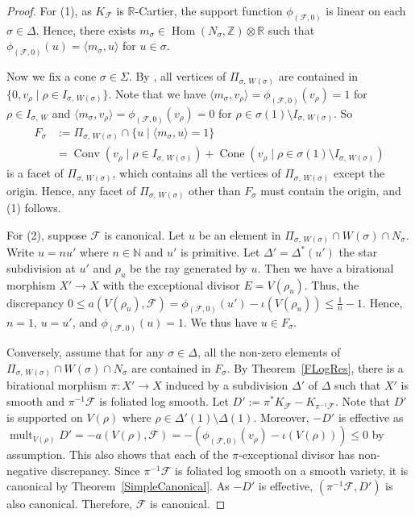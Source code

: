 \documentclass[12pt,reqno]{amsart}
\theoremstyle{definition}
\newcommand{\on}{\operatorname}
\newcommand\cF{{\mathcal{F}}}
\newcommand\bN{{\mathbb N}}
\newcommand\bR{{\mathbb R}}
\newcommand\bZ{{\mathbb Z}}
\begin{document}
\begin{proof}
    For (1), as $K_{\cF}$ is $\bR$-Cartier, the support function $\phi_{(\cF,0)}$ is linear on each $\sigma\in\Delta$. 
    Hence, there exists $m_\sigma\in \on{Hom}(N_\sigma,\bZ)\otimes\bR$ such that $\phi_{(\cF,0)}(u) = \langle m_\sigma, u\rangle$ for $u\in\sigma$. 

    Now we fix a cone $\sigma\in\Sigma$. 
    By \cite[Lemma 7.1.1]{CLS11}, all vertices of $\Pi_{\sigma,\,W(\sigma)}$ are contained in $\{0,v_\rho\mid\rho\in I_{\sigma,\,W(\sigma)}\}$. 
    Note that we have $\langle m_\sigma, v_\rho\rangle = \phi_{(\cF,0)}(v_\rho) = 1$ for $\rho\in I_{\sigma,\,W}$ and $\langle m_\sigma, v_\rho\rangle = \phi_{(\cF,0)}(v_\rho) = 0$ for $\rho\in\sigma(1)\setminus I_{\sigma,\,W(\sigma)}$. 
    So 
    \begin{align*}
        F_\sigma &:= \Pi_{\sigma,\,W(\sigma)}\cap\{u\mid\langle m_\sigma, u\rangle=1\} \\
         &= \on{Conv}(v_\rho\mid\rho\in I_{\sigma,\,W(\sigma)}) + \on{Cone}(v_\rho\mid\rho\in\sigma(1)\setminus I_{\sigma,\,W(\sigma)})
    \end{align*}
    is a facet of $\Pi_{\sigma,\,W(\sigma)}$, which contains all the vertices of $\Pi_{\sigma,\,W(\sigma)}$ except the origin. 
    Hence, any facet of $\Pi_{\sigma,\,W(\sigma)}$ other than $F_\sigma$ must contain the origin, and (1) follows. 

    For (2), suppose $\cF$ is canonical. 
    Let $u$ be an element in $\Pi_{\sigma,\,W(\sigma)}\cap W(\sigma)\cap N_\sigma$. Write $u=nu'$ where $n\in \bN$ and $u'$ is primitive. 
    Let $\Delta'=\Delta^*(u')$ the star subdivision at $u'$ and $\rho_u$ be the ray generated by $u$. 
    Then we have a birational morphism $X'\to X$ with the exceptional divisor $E=V(\rho_u)$. 
    Thus, the discrepancy $0\leq a(V(\rho_u),\cF) = \phi_{(\cF,0)}(u')-\iota(V(\rho_u))\leq \frac{1}{n}-1$. 
    Hence, $n=1$, $u=u'$, and $\phi_{(\cF,0)}(u)=1$. 
    We thus have $u\in F_\sigma$. 
        
    Conversely, assume that for any $\sigma\in\Delta$, all the non-zero elements of $\Pi_{\sigma,\,W(\sigma)}\cap W(\sigma)\cap N_\sigma$ are contained in $F_\sigma$. 
    By Theorem~\ref{FLogRes}, there is a birational morphism $\pi\colon X'\to X$ induced by a subdivision $\Delta'$ of $\Delta$ such that $X'$ is smooth and $\pi^{-1}\cF$ is foliated log smooth. 
    Let $D':=\pi^*K_\cF - K_{\pi^{-1}\cF}$. 
    Note that $D'$ is supported on $V(\rho)$ where $\rho\in\Delta'(1)\setminus\Delta(1)$. 
    Moreover, $-D'$ is effective as $\on{mult}_{V(\rho)}D' = -a(V(\rho),\cF) = -(\phi_{(\cF,0)}(v_\rho)-\iota(V(\rho)))\leq 0$ by assumption. This also shows that each of the $\pi$-exceptional divisor has non-negative discrepancy.
    Since $\pi^{-1}\cF$ is foliated log smooth on a smooth variety, it is canonical by Theorem~\ref{SimpleCanonical}. 
    As $-D'$ is effective, $(\pi^{-1}\cF,D')$ is also canonical. 
    Therefore, $\cF$ is canonical. 


\end{proof}
\end{document}
